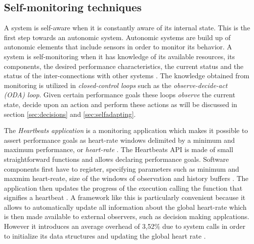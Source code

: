 \subsection{Self-monitoring techniques}
\label{sec:selfawareness}
A system is self-aware when it is constantly aware of its internal state. This is the first step towards an autonomic system. Autonomic systems are build up of autonomic elements that include sensors in order to monitor its behavior. A system is self-monitoring when it has knowledge of its available resources, its components, the desired performance characteristics, the current status and the status of the inter-connections with other systems \cite{autonomic}. The knowledge obtained from monitoring is utilized in \emph{closed-control loops} such as the \emph{observe-decide-act (ODA) loop}. Given certain performance goals these loops \emph{observe} the current state, decide upon an action and perform these actions as will be discussed in section \ref{sec:decisions} and \ref{sec:selfadapting}.

The \emph{Heartbeats application} is a monitoring application which makes it possible to assert performance goals as heart-rate windows delimited by a minimum and maximum performance, or \emph{heart-rate} \cite{evolvable}. The Heartbeats API is made of small straightforward functions and allows declaring performance goals. Software components first have to register, specifying parameters such as minimum and maxmim heart-reate, size of the windows of observation and history buffers \cite{selfaware}. The application then updates the progress of the execution calling the function that signifies a heartbeat \cite{evolvable}. A framework like this is particularly convenient because it allows to automatically update all information about the global heart-rate which is then made available to external observers, such as decision making applcations. However it introduces an average overhead of 3,52\% due to system calls in order to initialize its data structures and updating the global heart rate \cite{selfaware}.